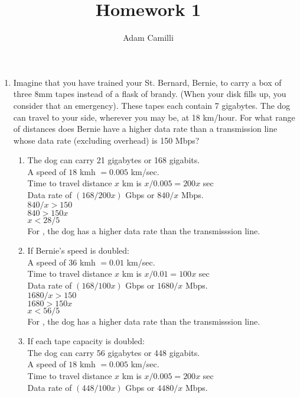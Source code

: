 \documentclass[12pt]{article}
\begin{document}
\title{Homework 1}
\maketitle
\author{Adam Camilli}
\begin{enumerate}
\item Imagine that you have trained your St. Bernard, Bernie, to carry a box of three 8mm tapes instead of a flask of brandy. (When your disk fills up, you consider that an emergency). These tapes each contain 7 gigabytes. The dog can travel to your side, wherever you may be, at 18 km/hour. For what range of distances does Bernie have a higher data rate than a transmission line whose data rate (excluding overhead) is 150 Mbps? 
  \begin{enumerate}
  \item The dog can carry 21 gigabytes or 168 gigabits.\\
    A speed of $18$ kmh $= 0.005$ km/sec. \\
    Time to travel distance $x$ km is $x/0.005 = 200x$ sec\\ 
    Data rate of $(168/200x)$ Gbps or $840/x$ Mbps. \\
    $840/x > 150$ \\
    $840 > 150x$ \\
    $x < 28/5$ \\
    For , the dog has a higher data rate than the transmisssion line.
  \item If Bernie's speed is doubled: \\
    A speed of $36$ kmh $= 0.01$ km/sec. \\
    Time to travel distance $x$ km is $x/0.01 = 100x$ sec\\ 
    Data rate of $(168/100x)$ Gbps or $1680/x$ Mbps. \\
    $1680/x > 150$ \\
    $1680 > 150x$ \\
    $x < 56/5$ \\ 
    For , the dog has a higher data rate than the transmisssion line.
  \item If each tape capacity is doubled: \\
    The dog can carry 56 gigabytes or 448 gigabits.\\
    A speed of $18$ kmh $= 0.005$ km/sec. \\
    Time to travel distance $x$ km is $x/0.005 = 200x$ sec\\ 
    Data rate of $(448/100x)$ Gbps or $4480/x$ Mbps. \\

\end{enumerate}
\end{enumerate}
\end{document}
